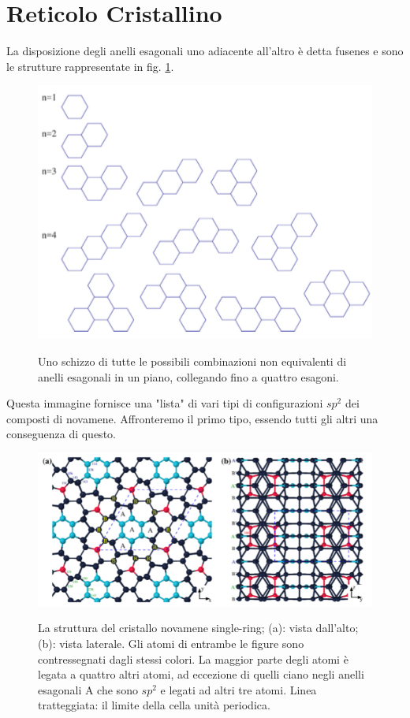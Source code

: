 \documentclass[a4paper,titlepage]{book}
\begin{document}
\section{Reticolo Cristallino}
La disposizione  degli anelli esagonali uno adiacente all'altro è detta fusenes e sono le strutture rappresentate in fig. \ref{nononova}. \\
\begin{figure}[h!] 
	\centering \label{nononova}
	\includegraphics[width=0.55\columnwidth]{Nova.png}
	\caption{ 	Uno schizzo di tutte le possibili combinazioni non equivalenti di anelli esagonali in un piano, collegando fino a quattro esagoni.
	}
\end{figure}
Questa immagine fornisce una "lista" di vari tipi di configurazioni $sp^2$ dei composti di novamene. Affronteremo il primo tipo, essendo tutti gli altri una conseguenza di questo. \\
\begin{figure}[h!] 
	\centering \label{novacarbon}
	\includegraphics[width=0.86\columnwidth]{SimpleNovamene.png}
	\caption{ 	La struttura del cristallo novamene single-ring; (a): vista dall'alto; (b): vista laterale. Gli atomi di entrambe le figure sono contressegnati dagli stessi colori. La maggior parte degli atomi è legata a quattro altri atomi, ad eccezione di quelli ciano negli anelli esagonali A che sono $sp^2$ e legati ad altri tre atomi. Linea tratteggiata: il limite della cella unità periodica.}
\end{figure}
\end{document}
